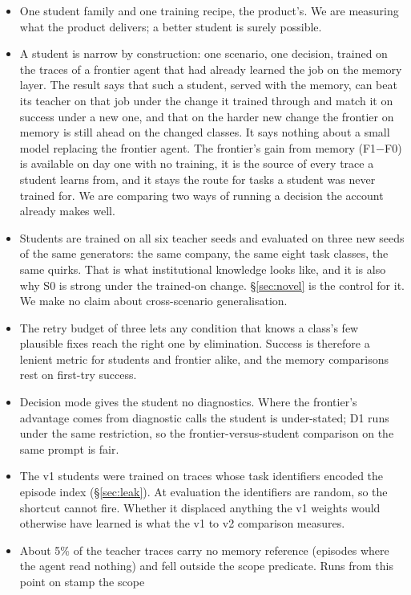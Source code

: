 \documentclass[11pt]{article}
\newcommand{\cond}[1]{\textsf{#1}}
\begin{document}
\begin{itemize}[leftmargin=1.4em, itemsep=2pt]
\item One student family and one training recipe, the product's. We are measuring what the
product delivers; a better student is surely possible.
\item A student is narrow by construction: one scenario, one decision, trained on the traces
of a frontier agent that had already learned the job on the memory layer. The result says
that such a student, served with the memory, can beat its teacher on that job under the
change it trained through and match it on success under a new one, and that on the harder
new change the frontier on memory is still ahead on the changed classes. It says nothing
about a small model replacing the frontier agent. The frontier's gain from
memory (\cond{F1}$-$\cond{F0}) is available on day one with no training, it is the source of
every trace a student learns from, and it stays the route for tasks a student was never
trained for. We are comparing two ways of running a decision the account already makes
well.
\item Students are trained on all six teacher seeds and evaluated on three new seeds of the
same generators: the same company, the same eight task classes, the same quirks. That is
what institutional knowledge looks like, and it is also why \cond{S0} is strong under the
trained-on change. \S\ref{sec:novel} is the control for it. We make no claim about
cross-scenario generalisation.
\item The retry budget of three lets any condition that knows a class's few plausible fixes
reach the right one by elimination. Success is therefore a lenient metric for students and
frontier alike, and the memory comparisons rest on first-try success.
\item Decision mode gives the student no diagnostics. Where the frontier's advantage comes
from diagnostic calls the student is under-stated; \cond{D1} runs under the same
restriction, so the frontier-versus-student comparison on the same prompt is fair.
\item The v1 students were trained on traces whose task identifiers encoded the episode
index (\S\ref{sec:leak}). At evaluation the identifiers are random, so the shortcut cannot
fire. Whether it displaced anything the v1 weights would otherwise have learned is what the
v1 to v2 comparison measures.
\item About 5\% of the teacher traces carry no memory reference (episodes where the agent
read nothing) and fell outside the scope predicate. Runs from this point on stamp the scope

\end{itemize}
\end{document}

